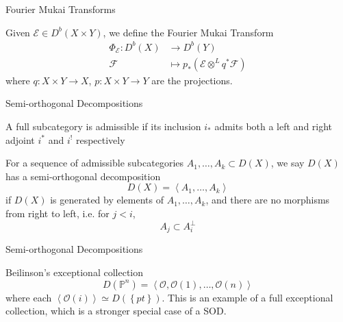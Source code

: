 \documentclass{beamer}
\begin{document}
\begin{frame}{Fourier Mukai Transforms}
\begin{definition}
Given $\mathcal{E}\in D^b(X\times Y)$, we define the Fourier Mukai Transform
\begin{align*}
\Phi_\mathcal{E} : D^{b}(X) &\to D^b(Y) \\
\mathcal{F} &\mapsto p_{*}(\mathcal{E}\otimes^L q^*\mathcal{F})
\end{align*}
where $q:X\times Y\to X$, $p:X\times Y\to Y$ are the projections.    
\end{definition}

\end{frame}


\begin{frame}{Semi-orthogonal Decompositions}
    \begin{definition}
        A full subcategory is admissible if its inclusion $i_*$ admits both a left and right adjoint $i^*$ and $i^!$ respectively
    \end{definition}
    \begin{definition}
        For a sequence of admissible subcategories $A_{1}, \dots, A_{k}\subset D(X)$, we say $D(X)$ has a semi-orthogonal decomposition $$D(X) = \left< A_1,\dots,A_k \right> $$ if $D(X)$ is generated by elements of $A_1,\dots,A_k$, and there are no morphisms from right to left, i.e. for $j<i$, $$A_{j}\subset A_i^\perp$$
    \end{definition}
\end{frame}

\begin{frame}{Semi-orthogonal Decompositions}
    \begin{example}{Beilinson's exceptional collection}
        $$D(\mathbb{P}^{n})= \left< \mathcal{O}, \mathcal{O}(1),\dots,\mathcal{O}(n) \right> $$ where each $\left< \mathcal{O}(i) \right>\simeq D(\left\{ pt \right\})$. This is an example of a full exceptional collection, which is a stronger special case of a SOD. 
    \end{example}
\end{frame}
\end{document}

